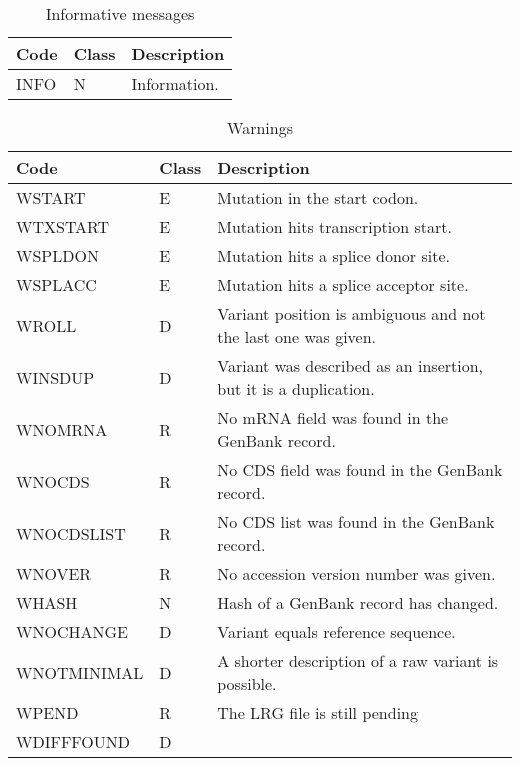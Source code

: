 \begin{table}[H]
\begin{center}
\begin{tabular}{l|l|l}
Code & Class & Description \\
\hline
INFO & N & Information.
\end{tabular}
\end{center}
\caption{Informative messages} \label{tab:info}
\end{table}

\begin{table}[H]
\begin{center}
\begin{tabular}{l|l|p{7cm}}
Code & Class & Description \\
\hline
WSTART      & E & Mutation in the start codon. \\
WTXSTART    & E & Mutation hits transcription start. \\
WSPLDON     & E & Mutation hits a splice donor site. \\
WSPLACC     & E & Mutation hits a splice acceptor site. \\
WROLL       & D & Variant position is ambiguous and not the last one was 
                  given. \\
WINSDUP     & D & Variant was described as an insertion, but it is a
                  duplication. \\
WNOMRNA     & R & No mRNA field was found in the GenBank record. \\
WNOCDS      & R & No CDS field was found in the GenBank record. \\
WNOCDSLIST  & R & No CDS list was found in the GenBank record. \\
WNOVER      & R & No accession version number was given. \\
WHASH       & N & Hash of a GenBank record has changed. \\
WNOCHANGE   & D & Variant equals reference sequence. \\
WNOTMINIMAL & D & A shorter description of a raw variant is possible. \\
WPEND       & R & The LRG file is still pending \\
WDIFFFOUND  & D & 
\end{tabular}
\end{center}
\caption{Warnings} \label{tab:warnings}
\end{table}

